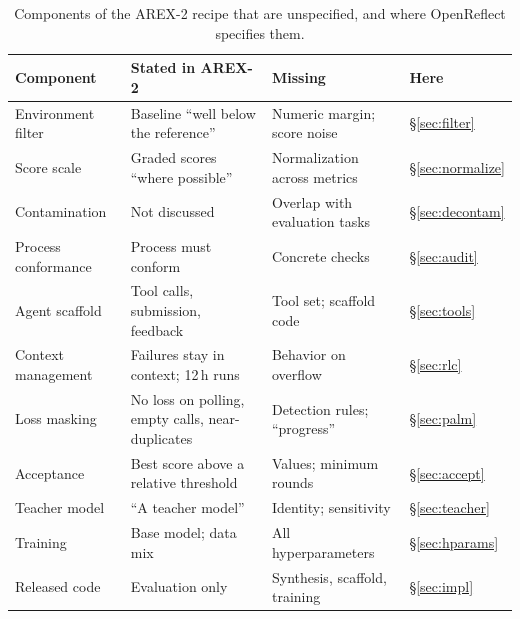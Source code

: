 \documentclass[11pt]{article}
\begin{document}
\begin{table}[t]
\centering
\small
\caption{Components of the AREX-2 recipe that are unspecified, and where OpenReflect specifies them.}
\label{tab:gaps}
\begin{tabularx}{\linewidth}{@{}l Y Y l@{}}
\toprule
Component & Stated in AREX-2 & Missing & Here \\
\midrule
Environment filter & Baseline ``well below the reference'' & Numeric margin; score noise & \S\ref{sec:filter} \\
Score scale & Graded scores ``where possible'' & Normalization across metrics & \S\ref{sec:normalize} \\
Contamination & Not discussed & Overlap with evaluation tasks & \S\ref{sec:decontam} \\
Process conformance & Process must conform & Concrete checks & \S\ref{sec:audit} \\
Agent scaffold & Tool calls, submission, feedback & Tool set; scaffold code & \S\ref{sec:tools} \\
Context management & Failures stay in context; 12\,h runs & Behavior on overflow & \S\ref{sec:rlc} \\
Loss masking & No loss on polling, empty calls, near-duplicates & Detection rules; ``progress'' & \S\ref{sec:palm} \\
Acceptance & Best score above a relative threshold & Values; minimum rounds & \S\ref{sec:accept} \\
Teacher model & ``A teacher model'' & Identity; sensitivity & \S\ref{sec:teacher} \\
Training & Base model; data mix & All hyperparameters & \S\ref{sec:hparams} \\
Released code & Evaluation only & Synthesis, scaffold, training & \S\ref{sec:impl} \\
\bottomrule
\end{tabularx}
\end{table}
\end{document}
